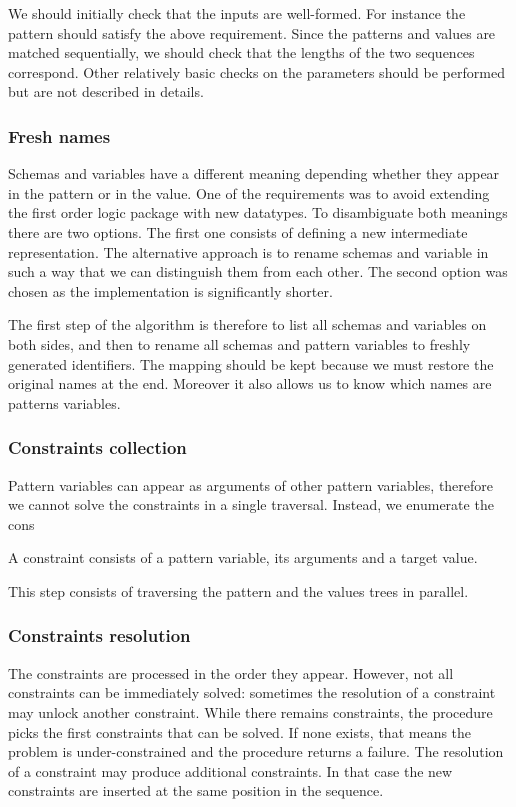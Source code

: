 We should initially check that the inputs are well-formed. For instance the pattern should satisfy the above requirement. Since the patterns and values are matched sequentially, we should check that the lengths of the two sequences correspond. Other relatively basic checks on the parameters should be performed but are not described in details.

\subsubsection{Fresh names}

Schemas and variables have a different meaning depending whether they appear in the pattern or in the value. One of the requirements was to avoid extending the first order logic package with new datatypes. To disambiguate both meanings there are two options. The first one consists of defining a new intermediate representation. The alternative approach is to rename schemas and variable in such a way that we can distinguish them from each other. The second option was chosen as the implementation is significantly shorter.

The first step of the algorithm is therefore to list all schemas and variables on both sides, and then to rename all schemas and pattern variables to freshly generated identifiers. The mapping should be kept because we must restore the original names at the end. Moreover it also allows us to know which names are patterns variables.

\subsubsection{Constraints collection}

Pattern variables can appear as arguments of other pattern variables, therefore we cannot solve the constraints in a single traversal. Instead, we enumerate the cons

A constraint consists of a pattern variable, its arguments and a target value.

This step consists of traversing the pattern and the values trees in parallel.

\subsubsection{Constraints resolution}

The constraints are processed in the order they appear. However, not all constraints can be immediately solved: sometimes the resolution of a constraint may unlock another constraint. While there remains constraints, the procedure picks the first constraints that can be solved. If none exists, that means the problem is under-constrained and the procedure returns a failure. The resolution of a constraint may produce additional constraints. In that case the new constraints are inserted at the same position in the sequence.

